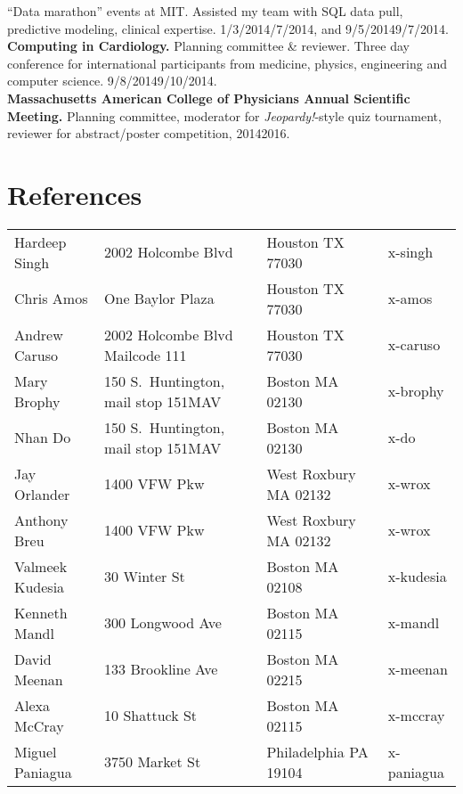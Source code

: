 \documentclass[10pt]{article}
\begin{document}
``Data marathon'' events at MIT. Assisted my team with SQL data pull,
predictive modeling, clinical expertise.
1/3/2014\ndash{}/7/2014, and 9/5/2014\ndash{}9/7/2014.\\
\textbf{Computing in Cardiology.} Planning committee \& reviewer.
Three day conference for international participants from medicine,
physics, engineering and computer science.
9/8/2014\ndash{}9/10/2014.\\
\textbf{Massachusetts American College of Physicians Annual Scientific
  Meeting.} Planning committee, moderator for \emph{Jeopardy!}-style
quiz tournament, reviewer for abstract/poster competition,
2014\ndash{}2016.




\section*{References}
\begin{tabular}{llll}

Hardeep Singh & 2002 Holcombe Blvd              & Houston TX 77030 & x-singh\\
Chris Amos    & One Baylor Plaza                & Houston TX 77030 & x-amos\\
Andrew Caruso & 2002 Holcombe Blvd Mailcode 111 & Houston TX 77030 & x-caruso\\

Mary Brophy & 150 S.\ Huntington, mail stop 151MAV & Boston MA 02130 & x-brophy\\
Nhan Do     & 150 S.\ Huntington, mail stop 151MAV & Boston MA 02130 & x-do\\

Jay Orlander    & 1400 VFW Pkw      & West Roxbury MA 02132 & x-wrox\\
Anthony Breu    & 1400 VFW Pkw      & West Roxbury MA 02132 & x-wrox\\
Valmeek Kudesia & 30 Winter St      & Boston MA 02108       & x-kudesia\\
Kenneth Mandl   & 300 Longwood Ave  & Boston MA 02115       & x-mandl\\
David Meenan    & 133 Brookline Ave & Boston MA 02215       & x-meenan\\
Alexa McCray    & 10 Shattuck St    & Boston MA 02115       & x-mccray\\
Miguel Paniagua & 3750 Market St    & Philadelphia PA 19104 & x-paniagua
\end{tabular}
\end{document}
